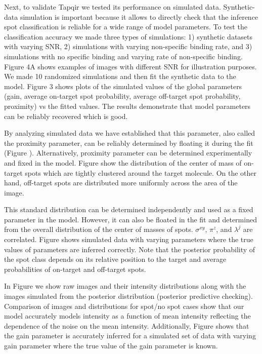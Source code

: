 Next, to validate Tapqir we tested its performance on simulated data. Synthetic-data simulation is important because it allows to directly check that the inference spot classification is reliable for a wide range of model parameters. To test the classification accuracy we made three types of simulations: 1) synthetic datasets with varying SNR, 2) simulations with varying non-specific binding rate, and 3) simulations with no specific binding and varying rate of non-specific binding. Figure 4A shows examples of images with different SNR for illustration purposes. We made 10 randomized simulations and then fit the synthetic data to the model. Figure 3 shows plots of the simulated values of the global parameters (gain, average on-target spot probability, average off-target spot probability, proximity) vs the fitted values. The results demonstrate that model parameters can be reliably recovered which is good.

By analyzing simulated data we have established that this parameter, also called the proximity parameter, can be reliably determined by floating it during the fit (Figure ). Alternatively, proximity parameter can be determined experimentally and fixed in the model. Figure show the distribution of the center of mass of on-target spots which are tightly clustered around the target molecule. On the other hand, off-target spots are distributed more uniformly across the area of the image.

This standard distribution can be determined independently and used as a fixed parameter in the model. However, it can also be floated in the fit and determined from the overall distribution of the center of masses of spots. $\sigma^{xy}$, $\pi^z$, and $\lambda^j$ are correlated. Figure shows simulated data with varying parameters where the true values of parameters are inferred correctly. Note that the posterior probability of the spot class depends on its relative position to the target and average probabilities of on-target and off-target spots.

In Figure we show raw images and their intensity distributions along with the images simulated from the posterior distribution (posterior predictive checking). Comparison of images and distributions for spot/no spot cases show that our model accurately models intensity as a function of mean intensity reflecting the dependence of the noise on the mean intensity. Additionally, Figure shows that the gain parameter is accurately inferred for a simulated set of data with varying gain parameter where the true value of the gain parameter is known.

